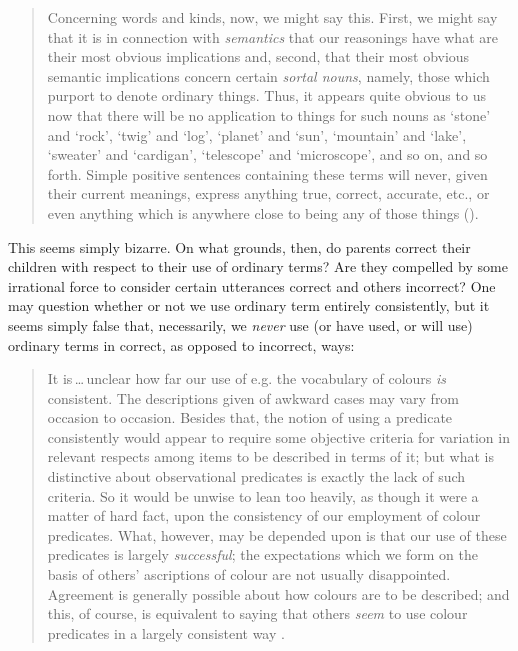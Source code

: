 \documentclass[11pt]{standalone} \newif\ifstandlone \standalonetrue
\newenvironment{squote}{%
	\begin{quote}\begin{singlespace}%
	}{%
	\end{singlespace}\end{quote}}
\begin{document}
\begin{spacing}{1.5}
\begin{enumerate}
\begin{squote}
Concerning words and kinds, now, we might say this.  First, we might
say that it is in connection with \emph{semantics} that our reasonings have
what are their most obvious implications and, second, that their most
obvious semantic implications concern certain \emph{sortal nouns}, namely,
those which purport to denote ordinary things.  Thus, it appears quite
obvious to us now that there will be no application to things for such
nouns as `stone' and `rock', `twig' and `log', `planet' and `sun',
`mountain' and `lake', `sweater' and `cardigan', `telescope' and
`microscope', and so on, and so forth.  Simple positive sentences
containing these terms will never, given their current meanings,
express anything true, correct, accurate, etc., or even anything which
is anywhere close to being any of those things
(\citeyear[148]{unger1979}).
\end{squote}

This seems simply bizarre.  On what grounds, then, do parents correct
their children with respect to their use of ordinary terms?  Are they
compelled by some irrational force to consider certain utterances
correct and others incorrect?  One may question whether or not we use
ordinary term entirely consistently, but it seems simply false that,
necessarily, we {\em never} use (or have used, or will use) ordinary
terms in correct, as opposed to incorrect, ways:

\begin{squote}
It is\,\ldots\,unclear how far our use of e.g. the vocabulary of
colours \emph{is} consistent.  The descriptions given of awkward cases
may vary from occasion to occasion.  Besides that, the notion of using
a predicate consistently would appear to require some objective
criteria for variation in relevant respects among items to be
described in terms of it; but what is distinctive about observational
predicates is exactly the lack of such criteria.  So it would be
unwise to lean too heavily, as though it were a matter of hard fact,
upon the consistency of our employment of colour predicates.  What,
however, may be depended upon is that our use of these predicates is
largely \emph{successful}; the expectations which we form on the basis
of others' ascriptions of colour are not usually disappointed.
Agreement is generally possible about how colours are to be described;
and this, of course, is equivalent to saying that others \emph{seem}
to use colour predicates in a largely consistent way
\citep[361]{wright1975}.
\end{squote}


\end{enumerate}
\end{spacing}
\end{document}
